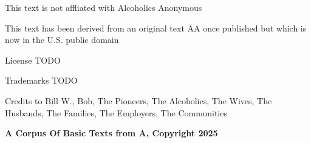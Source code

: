 \begin{legalchapter}


This text is not affliated with Alcoholics Anonymous

This text has been derived from an original text AA once published 
but which is now in the U.S. public domain


License TODO


Trademarks TODO


Credits to Bill W., Bob, The Pioneers, The Alcoholics, The Wives, 
The Husbands, The Families, The Employers, The Communities

\vfill

\vfill
\noindent\small\textbf{A Corpus Of Basic Texts from A, Copyright 2025}\\

\end{legalchapter}
